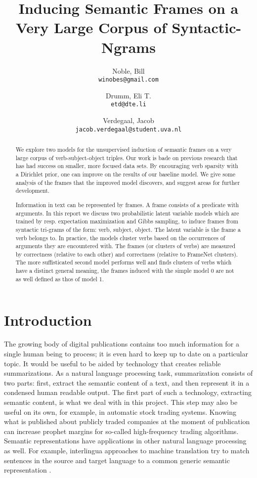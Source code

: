 \documentclass{article} %
\title{Inducing Semantic Frames on a Very Large Corpus of Syntactic-Ngrams}
\author{
    Noble, Bill\\
    \texttt{winobes@gmail.com}
    \and
    Drumm, Eli T.\\
    \texttt{etd@dte.li}
    \and
    Verdegaal, Jacob\\
    \texttt{jacob.verdegaal@student.uva.nl}
}
\begin{document}
\maketitle


\begin{abstract}
We explore two models for the unsupervised induction of semantic frames on a 
very large corpus of verb-subject-object triples. Our work is bade on previous 
research that has had success on smaller, more focused data sets. By encouraging 
verb sparsity with a Dirichlet prior, one can improve on the results of our 
baseline model. We give some analysis of the frames that the improved model 
discovers, and suggest areas for further development.

  Information in text can be represented by frames. A frame consists of a predicate with arguments. In this report we discuss two probabilistic latent variable models which are trained by resp. expectation maximization and Gibbs sampling, to induce frames from syntactic tri-grams of the form: verb, subject, object. The latent variable is the frame a verb belongs to. In practice, the models cluster verbs based on the occurrences of arguments they are encountered with. The frames (or clusters of verbs) are measured by correctness (relative to each other) and correctness (relative to FrameNet clusters). The more suffisticated second model performs well and finds clusters of verbs which have a distinct general meaning, the frames induced with the simple model 0 are not as well defined as thos of model 1. 
\end{abstract}

\section{Introduction}
The growing body of digital publications contains too much information for a single human being to process; it is even hard to keep up to date on a particular topic. It would be useful to be aided by technology that creates reliable summarizations. As a natural language processing task, summarization consists of two parts: first, extract the semantic content of a text, and then represent it in a condensed human readable output. The first part of such a technology, extracting semantic content, is what we deal with in this project. This step may also be useful on its own, for example, in automatic stock trading systems. Knowing what is published about publicly traded companies at the moment of publication can increase prophet margins for so-called high-frequency trading algorithms. Semantic representations have applications in other natural language processing as well. For example, interlingua approaches to machine translation try to match sentences in the source and target language to a common generic semantic representation \cite{boas2005}.
\end{document}
